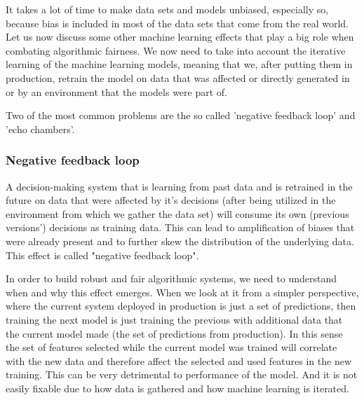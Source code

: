 It takes a lot of time to make data sets and models unbiased, especially so, because bias is included in most of the  data sets that come from the real world. Let us now discuss some other machine learning effects that play a big role when combating algorithmic fairness. We now need to take into account the iterative learning of the machine learning models, meaning that we, after putting them in production, retrain the model on data that was affected or directly generated in or by an environment that the models were part of.

Two of the most common problems are the so called 'negative feedback loop' and 'echo chambers'. 


\subsubsection{Negative feedback loop}\label{subsubsec:02_algo_fairness.adverse_effects.nfl}

A decision-making system that is learning from past data and is retrained in the future on data that were affected by it's decisions  (after being utilized in the environment from which we gather the data set) will consume its own (previous versions') decisions as training data. This can lead to amplification of biases that were already present and to further skew the distribution of the underlying data. This effect is called "negative feedback loop". 


In order to build robust and fair algorithmic systems, we need to understand when and why this effect emerges. When we look at it from a simpler perspective, where the current system deployed in production is just a set of predictions, then training the next model is just training the previous with additional data that the current model made (the set of predictions from production). In this sense the set of features selected while the current model was trained will correlate with the new data and therefore affect the selected and used features in the new training. This can be very detrimental to performance of the model. And it is not easily fixable due to how data is gathered and how machine learning is iterated.

